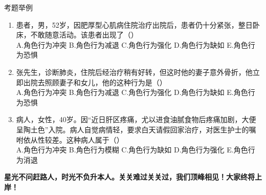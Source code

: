 \documentclass[11pt, a4paper]{ctexart}
\begin{document}
\begin{examplebox}{考题举例}
	\begin{enumerate}
		\item 患者，男，52岁，因肥厚型心肌病住院治疗出院后，患者仍十分紧张，整日卧床，不敢随意活动。该患者出现了（\qquad）\\
		      A.角色行为冲突 \quad B.角色行为减退 \quad C.角色行为强化 \quad D.角色行为缺如 \quad E.角色行为恐惧
		\item 张先生，诊断肺炎，住院后经治疗稍有好转，但这时他的妻子意外骨折，他立即出院去照顾妻子和女儿，他的这种行为是（\qquad）\\
		      A.角色行为冲突 \quad B.角色行为减退 \quad C.角色行为强化 \quad D.角色行为缺如 \quad E.角色行为恐惧
		\item 病人，女性，40岁。因“近日肝区疼痛，尤以进食油腻食物后疼痛加剧，大便呈陶土色”入院。病人自觉病情轻，要求白天请假回家治疗，对医生护士的嘱咐依从性较差。这种病人属于（\qquad）\\
		      A.角色行为冲突 \quad B.角色行为模糊 \quad C.角色行为缺如 \quad D.角色行为强化 \quad E.角色行为消退
	\end{enumerate}
\end{examplebox}

\begin{center}
	\Huge \bfseries 星光不问赶路人，时光不负升本人。关关难过关关过，我们顶峰相见！\textbf{大家终将上岸！}
\end{center}
\end{document}

